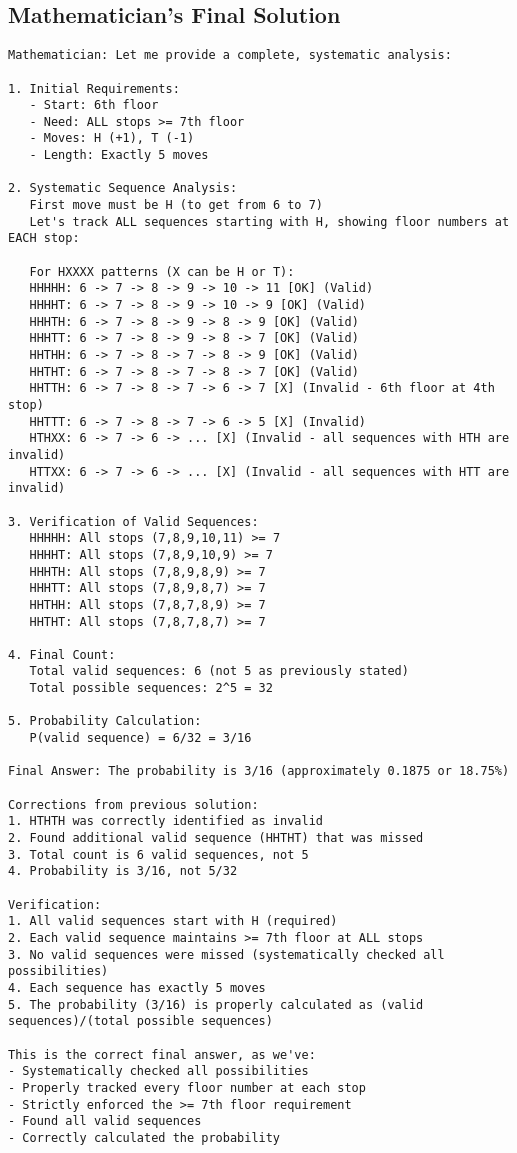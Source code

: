 \subsection{Mathematician's Final Solution}
\vspace{-0.5em}
\begin{mathematicianbox}
\begin{lstlisting}
Mathematician: Let me provide a complete, systematic analysis:

1. Initial Requirements:
   - Start: 6th floor
   - Need: ALL stops >= 7th floor
   - Moves: H (+1), T (-1)
   - Length: Exactly 5 moves

2. Systematic Sequence Analysis:
   First move must be H (to get from 6 to 7)
   Let's track ALL sequences starting with H, showing floor numbers at EACH stop:

   For HXXXX patterns (X can be H or T):
   HHHHH: 6 -> 7 -> 8 -> 9 -> 10 -> 11 [OK] (Valid)
   HHHHT: 6 -> 7 -> 8 -> 9 -> 10 -> 9 [OK] (Valid)
   HHHTH: 6 -> 7 -> 8 -> 9 -> 8 -> 9 [OK] (Valid)
   HHHTT: 6 -> 7 -> 8 -> 9 -> 8 -> 7 [OK] (Valid)
   HHTHH: 6 -> 7 -> 8 -> 7 -> 8 -> 9 [OK] (Valid)
   HHTHT: 6 -> 7 -> 8 -> 7 -> 8 -> 7 [OK] (Valid)
   HHTTH: 6 -> 7 -> 8 -> 7 -> 6 -> 7 [X] (Invalid - 6th floor at 4th stop)
   HHTTT: 6 -> 7 -> 8 -> 7 -> 6 -> 5 [X] (Invalid)
   HTHXX: 6 -> 7 -> 6 -> ... [X] (Invalid - all sequences with HTH are invalid)
   HTTXX: 6 -> 7 -> 6 -> ... [X] (Invalid - all sequences with HTT are invalid)

3. Verification of Valid Sequences:
   HHHHH: All stops (7,8,9,10,11) >= 7
   HHHHT: All stops (7,8,9,10,9) >= 7
   HHHTH: All stops (7,8,9,8,9) >= 7
   HHHTT: All stops (7,8,9,8,7) >= 7
   HHTHH: All stops (7,8,7,8,9) >= 7
   HHTHT: All stops (7,8,7,8,7) >= 7

4. Final Count:
   Total valid sequences: 6 (not 5 as previously stated)
   Total possible sequences: 2^5 = 32

5. Probability Calculation:
   P(valid sequence) = 6/32 = 3/16

Final Answer: The probability is 3/16 (approximately 0.1875 or 18.75%)

Corrections from previous solution:
1. HTHTH was correctly identified as invalid
2. Found additional valid sequence (HHTHT) that was missed
3. Total count is 6 valid sequences, not 5
4. Probability is 3/16, not 5/32

Verification:
1. All valid sequences start with H (required)
2. Each valid sequence maintains >= 7th floor at ALL stops
3. No valid sequences were missed (systematically checked all possibilities)
4. Each sequence has exactly 5 moves
5. The probability (3/16) is properly calculated as (valid sequences)/(total possible sequences)

This is the correct final answer, as we've:
- Systematically checked all possibilities
- Properly tracked every floor number at each stop
- Strictly enforced the >= 7th floor requirement
- Found all valid sequences
- Correctly calculated the probability
\end{lstlisting}
\end{mathematicianbox}

